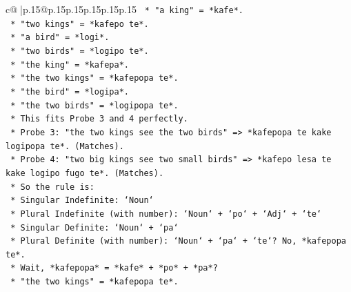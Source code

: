 \documentclass{article}
\begin{document}
{\begin{supertabular}{c@{$\;$}|p{.15\linewidth}@{}p{.15\linewidth}p{.15\linewidth}p{.15\linewidth}p{.15\linewidth}p{.15\linewidth}}
{{{\texttt{                                                    *   "a king" = *kafe*.} \\
\texttt{                                                    *   "two kings" = *kafepo te*.} \\
\texttt{                                                    *   "a bird" = *logi*.} \\
\texttt{                                                    *   "two birds" = *logipo te*.} \\
\texttt{                                                    *   "the king" = *kafepa*.} \\
\texttt{                                                    *   "the two kings" = *kafepopa te*.} \\
\texttt{                                                    *   "the bird" = *logipa*.} \\
\texttt{                                                    *   "the two birds" = *logipopa te*.} \\
\texttt{                                                    *   This fits Probe 3 and 4 perfectly.} \\
\texttt{                                                    *   Probe 3: "the two kings see the two birds" => *kafepopa te kake logipopa te*. (Matches).} \\
\texttt{                                                    *   Probe 4: "two big kings see two small birds" => *kafepo lesa te kake logipo fugo te*. (Matches).} \\
\texttt{                                                    *   So the rule is:} \\
\texttt{                                                        *   Singular Indefinite: `Noun`} \\
\texttt{                                                        *   Plural Indefinite (with number): `Noun` + `po` + `Adj` + `te`} \\
\texttt{                                                        *   Singular Definite: `Noun` + `pa`} \\
\texttt{                                                        *   Plural Definite (with number): `Noun` + `pa` + `te`? No, *kafepopa te*.} \\
\texttt{                                                        *   Wait, *kafepopa* = *kafe* + *po* + *pa*?} \\
\texttt{                                                        *   "the two kings" = *kafepopa te*.} \\
}}}
\end{supertabular}}
\end{document}
